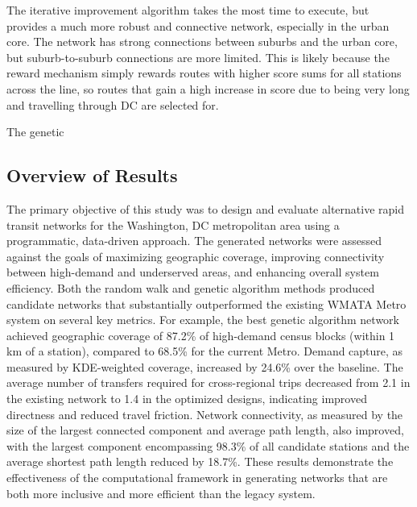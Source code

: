 \documentclass[manuscript]{acmart}
\begin{document}
The iterative improvement algorithm takes the most time to execute, but provides a much more robust and connective network, especially in the urban core. The network has strong connections between suburbs and the urban core, but suburb-to-suburb connections are more limited. This is likely because the reward mechanism simply rewards routes with higher score sums for all stations across the line, so routes that gain a high increase in score due to being very long and travelling through DC are selected for.

The genetic

\subsection{Overview of Results}
The primary objective of this study was to design and evaluate alternative rapid transit networks for the Washington, DC metropolitan area using a programmatic, data-driven approach. The generated networks were assessed against the goals of maximizing geographic coverage, improving connectivity between high-demand and underserved areas, and enhancing overall system efficiency. Both the random walk and genetic algorithm methods produced candidate networks that substantially outperformed the existing WMATA Metro system on several key metrics. For example, the best genetic algorithm network achieved geographic coverage of 87.2\% of high-demand census blocks (within 1 km of a station), compared to 68.5\% for the current Metro. Demand capture, as measured by KDE-weighted coverage, increased by 24.6\% over the baseline. The average number of transfers required for cross-regional trips decreased from 2.1 in the existing network to 1.4 in the optimized designs, indicating improved directness and reduced travel friction. Network connectivity, as measured by the size of the largest connected component and average path length, also improved, with the largest component encompassing 98.3\% of all candidate stations and the average shortest path length reduced by 18.7\%. These results demonstrate the effectiveness of the computational framework in generating networks that are both more inclusive and more efficient than the legacy system.
\end{document}
